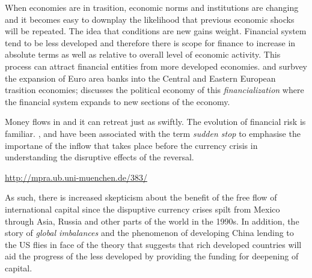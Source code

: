 \documentclass[12pt, a4paper, oneside]{article} %
\begin{document}
When economies are in trasition, economic norms and institutions are changing and it becomes easy to downplay the likelihood that previous economic shocks will be repeated.  The idea that conditions are new gains weight.  Financial system tend to be less developed and therefore there is scope for finance to increase in absolute terms as well as relative to overall level of economic activity.  This process can attract financial entities from more developed economies. \citet{ONBcarry} and \citet{EBRD} surbvey the expansion of Euro area banks into the Central and Eastern European trasition economies; \citet{Gabor} discusses the political economy of this \emph{financialization} where the financial system expands to new sections of the economy.  

Money flows in and it can retreat just as swiftly.  The evolution of financial risk is familiar. \citet{DornbuschSS}, \citet{CalvoSS} and \citet{KrugmanSS} have been associated with the term \emph{sudden stop} to emphasise the importane of the inflow that takes place before the currency crisis in understanding the disruptive effects of the reversal.   

 \href{http://mpra.ub.uni-muenchen.de/383/}{http://mpra.ub.uni-muenchen.de/383/}

As such, there is increased skepticism about the benefit of the free flow of international capital since the dispuptive currency crises spilt from Mexico through Asia, Russia and other parts of the world in the 1990s.  In addition, the story of \emph{global imbalances} and the phenomenon of developing China lending to the US flies in face of the theory that suggests that rich developed countries will aid the progress of the less developed by providing the funding for deepening of capital.  
\end{document}
